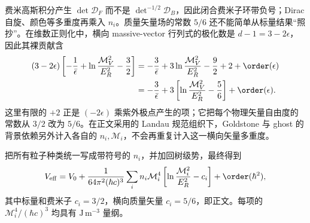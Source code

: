 \begin{derivation}
费米高斯积分产生 $\det\mathcal D_F$ 而不是 $\det^{-1/2}\mathcal D_B$，因此闭合费米子环带负号；Dirac 自旋、颜色等多重度再乘入 $n_i$。质量矢量场的常数 $5/6$ 还不能简单从标量结果“照抄”。在维数正则化中，横向 massive-vector 行列式的极化数是 $d-1=3-2\epsilon$，因此其裸贡献含
\begin{align*}
 (3-2\epsilon)
 \left[-\frac1{\bar\epsilon}
 +\ln\frac{\mathcal M_V^2}{E_R^2}-\frac32\right]
 &=-\frac3{\bar\epsilon}
 +3\ln\frac{\mathcal M_V^2}{E_R^2}
 -\frac92+2+\order(\epsilon)\\
 &=-\frac3{\bar\epsilon}
 +3\left[
 \ln\frac{\mathcal M_V^2}{E_R^2}-\frac56
 \right]+\order(\epsilon).
\end{align*}
这里有限的 $+2$ 正是 $(-2\epsilon)$ 乘紫外极点产生的项；它把每个物理矢量自由度的常数从 $3/2$ 改为 $5/6$。在正文采用的 Landau 规范组织下，Goldstone 与 ghost 的背景依赖另外计入各自的 $n_i,\mathcal M_i$，不会再重复计入这一横向矢量多重度。

把所有粒子种类统一写成带符号的 $n_i$，并加回树级势，最终得到
\begin{equation*}
 V_{\rm eff}=V_0+\frac1{64\pi^2(\hbar c)^3}
 \sum_i n_i\mathcal M_i^4
 \left[\ln\frac{\mathcal M_i^2}{E_R^2}-c_i\right]
 +\order(\hbar^2),
\end{equation*}
其中标量和费米子 $c_i=3/2$，横向质量矢量 $c_i=5/6$，即正文。每项的 $\mathcal M_i^4/(\hbar c)^3$ 均具有 $\mathrm{J\,m^{-3}}$ 量纲。
\end{derivation}
